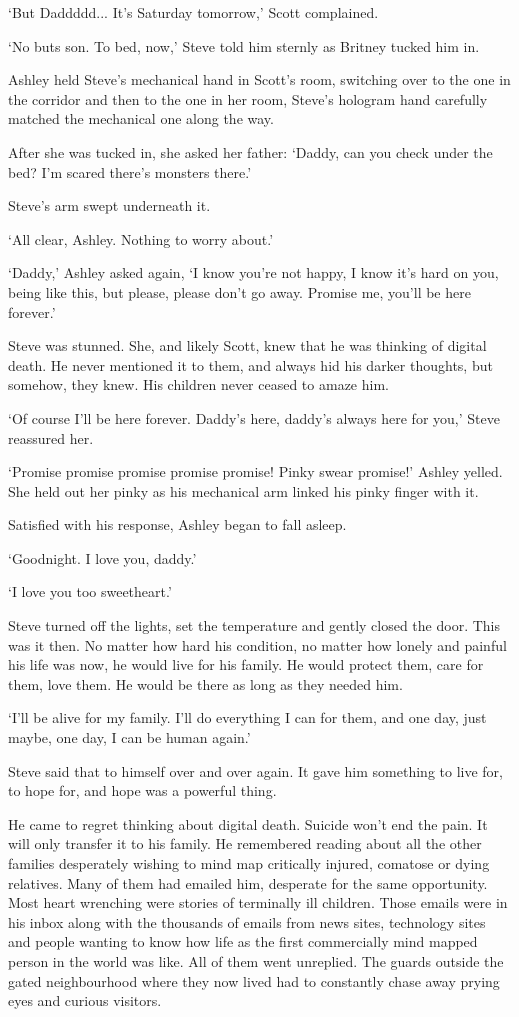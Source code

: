 `But Daddddd... It's Saturday tomorrow,' Scott complained.

`No buts son. To bed, now,' Steve told him sternly as Britney tucked him in. 

Ashley held Steve's mechanical hand in Scott's room, switching over to the one in the corridor and then to the one in her room, Steve's hologram hand carefully matched the mechanical one along the way.

After she was tucked in, she asked her father: `Daddy, can you check under the bed? I'm scared there's monsters there.'

Steve's arm swept underneath it.

`All clear, Ashley. Nothing to worry about.'

`Daddy,' Ashley asked again, `I know you're not happy, I know it's hard on you, being like this, but please, please don't go away. Promise me, you'll be here forever.'

Steve was stunned. She, and likely Scott, knew that he was thinking of digital death. He never mentioned it to them, and always hid his darker thoughts, but somehow, they knew. His children never ceased to amaze him.

`Of course I'll be here forever. Daddy's here, daddy's always here for you,' Steve reassured her.

`Promise promise promise promise promise! Pinky swear promise!' Ashley yelled. She held out her pinky as his mechanical arm linked his pinky finger with it.

Satisfied with his response, Ashley began to fall asleep.

`Goodnight. I love you, daddy.'

`I love you too sweetheart.'

Steve turned off the lights, set the temperature and gently closed the door. This was it then. No matter how hard his condition, no matter how lonely and painful his life was now, he would live for his family. He would protect them, care for them, love them. He would be there as long as they needed him.

`I'll be alive for my family. I'll do everything I can for them, and one day, just maybe, one day, I can be human again.'

Steve said that to himself over and over again. It gave him something to live for, to hope for, and hope was a powerful thing.

He came to regret thinking about digital death. Suicide won't end the pain. It will only transfer it to his family. He remembered reading about all the other families desperately wishing to mind map critically injured, comatose or dying relatives. Many of them had emailed him, desperate for the same opportunity. Most heart wrenching were stories of terminally ill children. Those emails were in his inbox along with the thousands of emails from news sites, technology sites and people wanting to know how life as the first commercially mind mapped person in the world was like. All of them went unreplied. The guards outside the gated neighbourhood where they now lived had to constantly chase away prying eyes and curious visitors.

